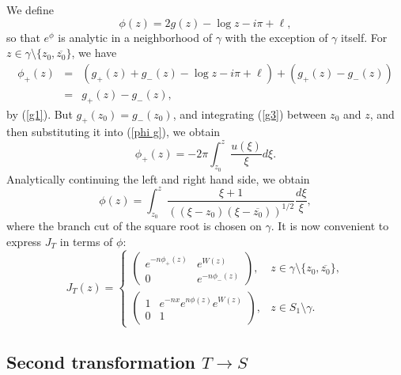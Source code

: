 \documentclass[11pt,fleqn]{article}
\numberwithin{equation}{section}
\begin{document}
We define 
\begin{equation}\label{def phi}
\phi(z)=2g(z)-\log z -i\pi+\ell, 
\end{equation}
so that $e^\phi$ is analytic in a neighborhood of $\gamma$ with the exception of $\gamma$ itself.
For $z\in\gamma\setminus\{z_{0},\overline{z_{0}}\}$, we have
\begin{eqnarray}\label{phi g}
\phi_+(z)&=&(g_+(z)+g_-(z)-\log z-i\pi+\ell)+(g_+(z)-g_-(z))\\
&=&g_+(z)-g_-(z),
\end{eqnarray}
by (\ref{g1}). But $g_+(z_0)=g_-(z_0)$, and integrating (\ref{g3}) between $z_0$ and $z$, and then substituting it into (\ref{phi g}), we obtain
\begin{equation}
\phi_+(z)=-2\pi\int_{z_0}^z\frac{u(\xi)}{\xi}d\xi.
\end{equation}
Analytically continuing the left and right hand side, we obtain
\begin{equation}\label{phi int}
\phi(z)=\int_{z_0}^{z} \frac{\xi+1}{\left((\xi-z_{0})(\xi-\overline{z_{0}})\right)^{1/2}} \frac{d\xi}{\xi},
\end{equation}
where the branch cut of the square root is chosen on $\gamma$. It is now convenient to express $J_T$ in terms of $\phi$:
\begin{equation*}
J_{T}(z) = \begin{cases} \begin{pmatrix}
e^{-n\phi_+(z)} & e^{W(z)} \\
0 & e^{-n\phi_-(z)}
\end{pmatrix}, & z \in \gamma\setminus\{z_{0},\overline{z_{0}}\}, \\
\begin{pmatrix}
1 & e^{-nx}e^{n\phi(z)}e^{W(z)} \\
0 & 1
\end{pmatrix}, & z \in S_{1} \setminus \gamma.
\end{cases}
\end{equation*}


\subsection{Second transformation $T \to S$}
\end{document}
